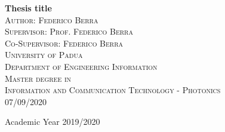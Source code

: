 \begin{titlepage}
  \begin{center}


    {\LARGE \bfseries Thesis title}\\[2cm]

    \textsc{\large Author: Federico Berra}\\
    \textsc{\large Supervisor: Prof. Federico Berra}\\
    \textsc{\large Co-Supervisor: Federico Berra}\\[1.2cm]

    \textsc{\LARGE University of Padua}\\[1.2cm]

    \textsc{\Large Department of Engineering Information}\\[1.2cm]

    \textsc{\Large Master degree in}\\[0.5cm]
    \textsc{\Large Information and Communication Technology - Photonics}\\[2cm]
    \textsc{\large 07/09/2020}\\
    \vfill

    {\large Academic Year 2019/2020}
  \end{center}
\end{titlepage}
